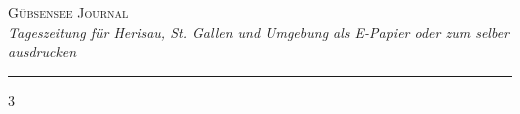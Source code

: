 ﻿\documentclass[a4paper,10pt]{article}
\newcommand{\NewspaperTitle}{Gübsensee Journal}
\newcommand{\NewspaperSubtitle}{Tageszeitung für Herisau, St. Gallen und Umgebung als E-Papier oder zum selber ausdrucken}
\begin{document}
\begin{center}
    {\fontsize{28}{32}\selectfont\textsc{\NewspaperTitle}} \\[2mm]
    {\large\itshape \NewspaperSubtitle} \\[4mm]
\end{center}

\hrule

\begin{multicols}{3}
\setlength{\parindent}{0pt}




\end{multicols}
\end{document}
